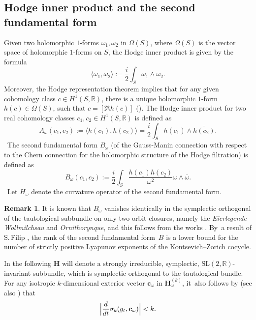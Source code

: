 \documentclass[10pt]{amsart}
\theoremstyle{plain}
\theoremstyle{definition}
\newtheorem{rem}[thm]{Remark}
\numberwithin{equation}{subsection}
\newcommand\bR{\mathbb{R}}\let\R\bR
\newcommand{\SL}{\mathrm{SL}}
\newcommand{\bfH}{\boldsymbol{H}}
\newcommand{\bfc}{\boldsymbol{c}}
\begin{document}
\subsection{Hodge inner product and the second fundamental form}\label{hodgenorm} Given two holomorphic $1$-forms $\omega_1,\omega_2$ in $\Omega(S)$, where $\Omega(S)$ is the vector space of holomorphic $1$-forms on $S$, the Hodge inner product is given by the formula
\[
\langle\omega_1,\omega_2 \rangle := \frac{i}{2}\int_S \omega_1 \wedge \overline{\omega_2}.
\]
Moreover, the Hodge representation theorem implies that for any given cohomology class $c \in H^1(S,\bR)$, there is a unique holomorphic $1$-form $h(c) \in \Omega(S)$, such that $c = [\Re  h(c)]$ (\cf \cite{FMZ12}). The Hodge inner product for two real cohomology classes $c_1,c_2 \in H^1(S,\bR)$
is defined as
\[
A_\omega(c_1,c_2) := \langle h(c_1),h(c_2) \rangle = \frac{i}{2}\int_S h(c_1) \wedge \overline{h(c_2)}.
\]\,
The second fundamental form $B_\omega$ (of the Gauss-Manin connection with respect to the Chern connection for the holomorphic structure of the Hodge filtration) is defined as
\[
B_\omega(c_1,c_2) := \frac{i}{2}\int_S \frac{h(c_1)h(c_2)}{\omega^2} \omega \wedge \overline{\omega}.
\] \,
Let $H_\omega$ denote the curvature operator of the second fundamental form.

\begin{rem}\label{b-vanishing}
It is known that $B_\omega$ vanishes identically in the symplectic orthogonal of the tautological subbundle on only two orbit closures, namely the \emph{Eierlegende Wollmilchsau} and \emph{Ornithorynque}, and this follows from the works \cite{Aul06, EKZ14, Mol05,AN19}. By~a result of S.\,Filip \cite{Fil17}, the rank of the second fundamental form~$B$ is a lower bound for the number of strictly positive Lyapunov exponents of the Kontsevich--Zorich cocycle.
\end{rem}
\sloppy
In the following $\bfH$ will denote a strongly irreducible, symplectic, $\SL(2,\R)$-invariant subbundle, which is symplectic orthogonal to the tautological bundle. For any isotropic $k$-dimensional exterior vector $\bfc_\omega$ in $\bfH^{(k)}_\omega$, it~also follows by \cite{For02} (see also \cite[Cor.\,2.2]{FMZ12}) that
\begin{align}
\Bigl|\frac{d}{dt} \sigma_k(g_t, \bfc_\omega)\Bigr| < k.\label{lipschitzprop}
\end{align}
\end{document}
